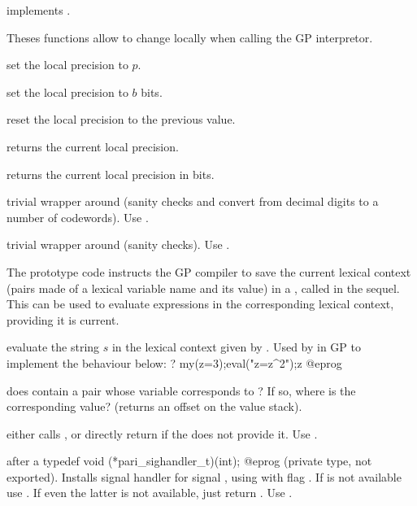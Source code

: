 implements \kbd{[a(x)|x<-b,c(x)]}.


Theses functions allow to change  locally when
calling the GP interpretor.

 set the local precision to $p$.

 set the local precision to $b$ bits.

 reset the local precision to the previous
value.

 returns the current local precision.

 returns the current local precision in bits.

 trivial wrapper around 
(sanity checks and convert from decimal digits to a number of codewords).
Use .

 trivial wrapper around 
(sanity checks). Use .


The prototype code  instructs the GP compiler to save the current
lexical context (pairs made of a lexical variable name and its value)
in a , called  in the sequel. This  can be used
to evaluate expressions in the corresponding lexical context, providing it is
current.

 evaluate the string $s$
in the lexical context given by .  Used by  in GP
to implement the behaviour below:
\bprog
? my(z=3);eval("z=z^2");z
@eprog

 does  contain
a pair whose variable corresponds to ? If so, where is the
corresponding value? (returns an offset on the value stack).


 either calls , or directly
return  if the  does not provide it. Use .

 after a
\bprog
  typedef void (*pari_sighandler_t)(int);
@eprog\noindent
(private type, not exported). Installs signal handler  for
signal , using  with flag . If
 is not available use . If even the latter is not
available, just return . Use .

